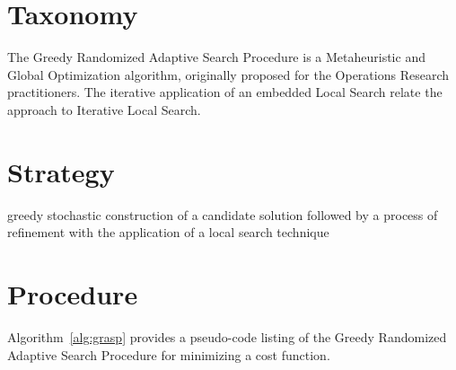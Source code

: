 \documentclass[a4paper, 11pt]{article}
\begin{document}
\section{Taxonomy}
\label{sec:taxonomy}
The Greedy Randomized Adaptive Search Procedure is a Metaheuristic and Global Optimization algorithm, originally proposed for the Operations Research practitioners.
The iterative application of an embedded Local Search relate the approach to Iterative Local Search.

\section{Strategy}
\label{sec:strategy}

greedy stochastic construction of a candidate solution followed by a process of refinement with the application of a local search technique



\section{Procedure}
\label{sec:procedure}
Algorithm~\ref{alg:grasp} provides a pseudo-code listing of the Greedy Randomized Adaptive Search Procedure for minimizing a cost function.
\end{document}
